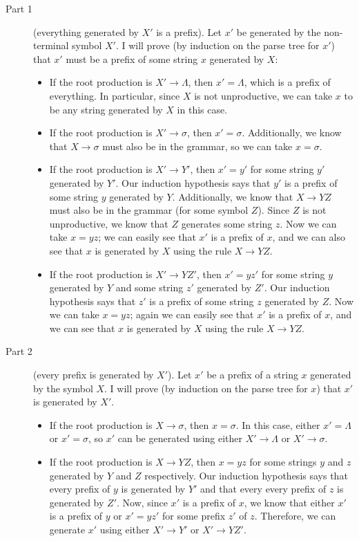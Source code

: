 \documentclass[12pt]{article}
\begin{document}
  \begin{description}
    \item[Part 1] (everything generated by $X'$ is a prefix).
      Let $x'$ be generated by the non-terminal symbol $X'$. I will prove (by induction on the parse tree for $x'$) that $x'$ must be a prefix of some string $x$ generated by $X$:
      \begin{itemize}
        \item
          If the root production is $X'\to\Lambda$, then $x'=\Lambda$, which is a prefix of everything. In particular, since $X$ is not unproductive, we can take $x$ to be any string generated by $X$ in this case.
        \item
          If the root production is $X'\to\sigma$, then $x'=\sigma$. Additionally, we know that $X\to\sigma$ must also be in the grammar, so we can take $x=\sigma$.
        \item
          If the root production is $X'\to Y'$, then $x'=y'$ for some string $y'$ generated by $Y'$. Our induction hypothesis says that $y'$ is a prefix of some string $y$ generated by $Y$. Additionally, we know that $X\to YZ$ must also be in the grammar (for some symbol $Z$). Since $Z$ is not unproductive, we know that $Z$ generates some string $z$. Now we can take $x=yz$; we can easily see that $x'$ is a prefix of $x$, and we can also see that $x$ is generated by $X$ using the rule $X\to YZ$.
        \item
          If the root production is $X'\to YZ'$, then $x'=yz'$ for some string $y$ generated by $Y$ and some string $z'$ generated by $Z'$. Our induction hypothesis says that $z'$ is a prefix of some string $z$ generated by $Z$. Now we can take $x=yz$; again we can easily see that $x'$ is a prefix of $x$, and we can see that $x$ is generated by $X$ using the rule $X\to YZ$.
      \end{itemize}
    \item[Part 2] (every prefix is generated by $X'$).
      Let $x'$ be a prefix of a string $x$ generated by the symbol $X$. I will prove (by induction on the parse tree for $x$) that $x'$ is generated by $X'$.
      \begin{itemize}
        \item
          If the root production is $X\to\sigma$, then $x=\sigma$. In this case, either $x'=\Lambda$ or $x'=\sigma$, so $x'$ can be generated using either $X'\to\Lambda$ or $X'\to\sigma$.
        \item
          If the root production is $X\to YZ$, then $x=yz$ for some strings $y$ and $z$ generated by $Y$ and $Z$ respectively. Our induction hypothesis says that every prefix of $y$ is generated by $Y'$ and that every every prefix of $z$ is generated by $Z'$. Now, since $x'$ is a prefix of $x$, we know that either $x'$ is a prefix of $y$ or $x'=yz'$ for some prefix $z'$ of $z$. Therefore, we can generate $x'$ using either $X'\to Y'$ or $X'\to YZ'$.
      \end{itemize}
  \end{description}
\end{document}
